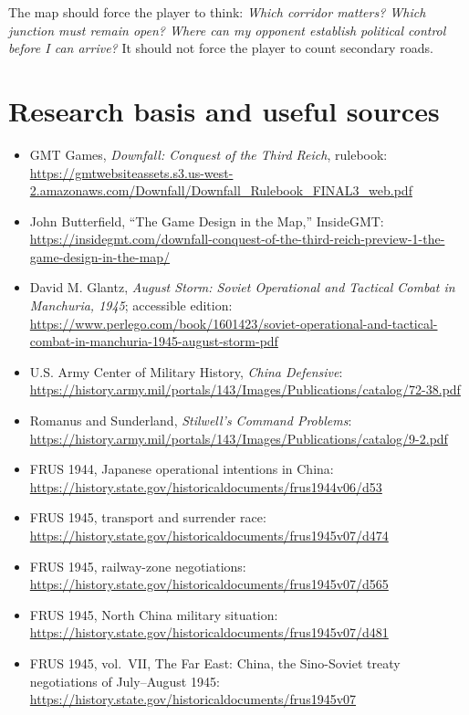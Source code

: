 \documentclass[11pt]{article}
\begin{document}
The map should force the player to think: \emph{Which corridor matters? Which junction must remain open? Where can my opponent establish political control before I can arrive?} It should not force the player to count secondary roads.

\section{Research basis and useful sources}
\begin{itemize}
\item GMT Games, \emph{Downfall: Conquest of the Third Reich}, rulebook: \url{https://gmtwebsiteassets.s3.us-west-2.amazonaws.com/Downfall/Downfall_Rulebook_FINAL3_web.pdf}
\item John Butterfield, ``The Game Design in the Map,'' InsideGMT: \url{https://insidegmt.com/downfall-conquest-of-the-third-reich-preview-1-the-game-design-in-the-map/}
\item David M. Glantz, \emph{August Storm: Soviet Operational and Tactical Combat in Manchuria, 1945}; accessible edition: \url{https://www.perlego.com/book/1601423/soviet-operational-and-tactical-combat-in-manchuria-1945-august-storm-pdf}
\item U.S. Army Center of Military History, \emph{China Defensive}: \url{https://history.army.mil/portals/143/Images/Publications/catalog/72-38.pdf}
\item Romanus and Sunderland, \emph{Stilwell's Command Problems}: \url{https://history.army.mil/portals/143/Images/Publications/catalog/9-2.pdf}
\item FRUS 1944, Japanese operational intentions in China: \url{https://history.state.gov/historicaldocuments/frus1944v06/d53}
\item FRUS 1945, transport and surrender race: \url{https://history.state.gov/historicaldocuments/frus1945v07/d474}
\item FRUS 1945, railway-zone negotiations: \url{https://history.state.gov/historicaldocuments/frus1945v07/d565}
\item FRUS 1945, North China military situation: \url{https://history.state.gov/historicaldocuments/frus1945v07/d481}
\item FRUS 1945, vol.~VII, The Far East: China, the Sino-Soviet treaty negotiations of July--August 1945: \url{https://history.state.gov/historicaldocuments/frus1945v07}
\end{itemize}
\end{document}
